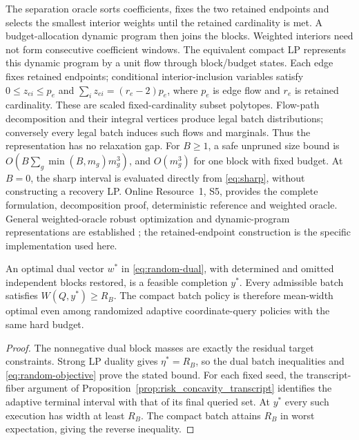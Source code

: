 The separation oracle sorts coefficients, fixes the two retained endpoints
and selects the smallest interior weights until the retained cardinality is
met. A budget-allocation dynamic program then joins the blocks. Weighted
interiors need not form consecutive coefficient windows. The equivalent
compact LP represents this dynamic program by a unit flow through block/budget
states. Each edge fixes retained endpoints; conditional interior-inclusion
variables satisfy $0\leq z_{ei}\leq p_e$ and
$\sum_i z_{ei}=(r_e-2)p_e$, where $p_e$ is edge flow and $r_e$ is retained
cardinality. These are scaled fixed-cardinality subset polytopes. Flow-path
decomposition and their integral vertices produce legal batch distributions;
conversely every legal batch induces such flows and marginals. Thus the
representation has no relaxation gap. For $B\geq1$, a safe unpruned size
bound is $O(B\sum_g\min(B,m_g)m_g^3)$, and $O(m_g^3)$ for one block with
fixed budget. At $B=0$, the sharp interval is evaluated directly from
\eqref{eq:sharp}, without constructing a recovery LP.
Online Resource~1, S5, provides the complete formulation, decomposition
proof, deterministic reference and weighted oracle. General weighted-oracle
robust optimization and dynamic-program representations are established
\citep{kawase2024,martin1990}; the retained-endpoint construction is the
specific implementation used here.

\begin{proposition}
\label{prop:adaptive-dual-completion}\label{sec:adaptive-dual-completion}
An optimal dual vector $w^*$ in \eqref{eq:random-dual}, with determined
and omitted independent blocks restored, is a feasible completion $y^*$.
Every admissible batch satisfies $W(Q,y^*)\geq R_B$. The compact batch
policy is therefore mean-width optimal even among randomized adaptive
coordinate-query policies with the same hard budget.
\end{proposition}
\begin{proof}
The nonnegative dual block masses are exactly the residual target
constraints. Strong LP duality gives $\eta^*=R_B$, so the dual batch
inequalities and \eqref{eq:random-objective} prove the stated bound.
For each fixed seed, the transcript-fiber argument of
Proposition~\ref{prop:risk_concavity_transcript} identifies the adaptive
terminal interval with that of its final queried set. At $y^*$ every
such execution has width at least $R_B$. The compact batch attains $R_B$
in worst expectation, giving the reverse inequality.
\end{proof}

